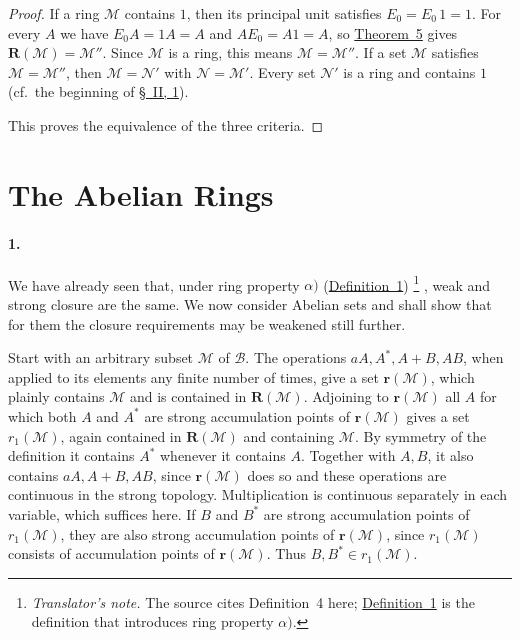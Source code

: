 \documentclass[
  paper=b5,
  twoside=true,
  fontsize=13pt,
  headings=normal,
  bookmarkpackage=false
]{scrartcl}
\theoremstyle{definition}
\newcommand{\TheoremRef}[1]{\hyperref[thm:#1]{Theorem~#1}}
\newcommand{\DefinitionRef}[1]{\hyperref[def:#1]{Definition~#1}}
\newcommand{\GeneratedRing}{\boldsymbol{R}}
\newcommand{\AlgebraicRing}{\boldsymbol{r}}
\newcounter{translatornote}
\newcounter{savedfootnote}
\newcommand{\TranslatorNote}[1]{%
  \stepcounter{translatornote}%
  \setcounter{savedfootnote}{\value{footnote}}%
  \begingroup
    \renewcommand{\thefootnote}{T\arabic{translatornote}}%
    \footnote{\textit{Translator's note.} #1}%
  \endgroup
  \setcounter{footnote}{\value{savedfootnote}}}
\begin{document}
\begin{proof}
If a ring \(\mathcal M\) contains \(1\), then its principal unit satisfies
\(E_0=E_0\,1=1\). For every \(A\) we have \(E_0A=1A=A\) and \(AE_0=A1=A\),
so \TheoremRef{5} gives \(\GeneratedRing (\mathcal M)=\mathcal M''\). Since
\(\mathcal M\) is a ring, this means \(\mathcal M=\mathcal M''\).
If a set \(\mathcal M\) satisfies \(\mathcal M=\mathcal M''\), then
\(\mathcal M=\mathcal N'\) with \(\mathcal N=\mathcal M'\). Every set
\(\mathcal N'\) is a ring and contains \(1\)
(cf.\ the beginning of \hyperref[sec:ring-and-commutant-1]{\S~II, 1}).

This proves the equivalence of the three criteria.
\end{proof}

\section{The Abelian Rings}
\label{sec:iii}

\paragraph*{1.}\label{sec:iii-1}
We have already seen that, under ring property \(\alpha)\)
(\DefinitionRef{1})\TranslatorNote{The source cites Definition~4 here;
\DefinitionRef{1} is the definition that introduces ring property
\(\alpha)\).}, weak and strong closure are the same.  We now consider
Abelian sets and shall show that for them the closure requirements may be
weakened still further.

Start with an arbitrary subset \(\mathcal M\) of \(\mathcal B\).
The operations \(aA,A^*,A+B,AB\), when applied to its elements any finite
number of times, give a set \(\AlgebraicRing (\mathcal M)\), which plainly contains
\(\mathcal M\) and is contained in \(\GeneratedRing (\mathcal M)\). Adjoining to
\(\AlgebraicRing (\mathcal M)\) all \(A\) for which both \(A\) and \(A^*\) are strong
accumulation points of \(\AlgebraicRing (\mathcal M)\) gives a set \(r_1(\mathcal M)\),
again contained in \(\GeneratedRing (\mathcal M)\) and containing \(\mathcal M\).
By symmetry of the definition it contains \(A^*\) whenever it contains
\(A\). Together with \(A,B\), it also contains \(aA,A+B,AB\), since
\(\AlgebraicRing (\mathcal M)\) does so and these operations are continuous in the
strong topology. Multiplication is continuous separately in each
variable, which suffices here. If \(B\) and \(B^*\) are strong
accumulation points of \(r_1(\mathcal M)\), they are also strong
accumulation points of \(\AlgebraicRing (\mathcal M)\), since \(r_1(\mathcal M)\)
consists of accumulation points of \(\AlgebraicRing (\mathcal M)\). Thus
\(B,B^*\in r_1(\mathcal M)\).
\end{document}
